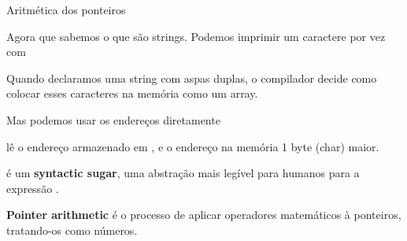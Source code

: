 \documentclass{beamer}
\begin{document}
\begin{frame}{Aritmética dos ponteiros}

  Agora que sabemos o que são strings. Podemos imprimir um caractere
  por vez com

  

  Quando declaramos uma string com aspas duplas, o compilador decide
  como colocar esses caracteres na memória como um array. 

  \framebreak

  Mas podemos usar os endereços diretamente

  

   lê o endereço armazenado em , e  o endereço na memória 1 byte (char) maior.

   é um \textbf{syntactic sugar}, uma abstração mais
  legível para humanos para a expressão .

  \framebreak

  \textbf{Pointer arithmetic} é o processo de aplicar operadores
  matemáticos à ponteiros, tratando-os como números.

\end{frame}
\end{document}
